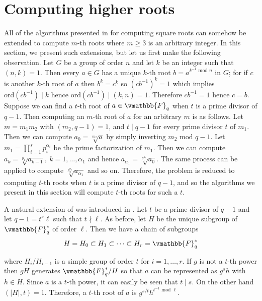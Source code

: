 \section{Computing higher roots}

All of the algorithms presented in  for computing square roots can 
somehow be extended to compute $m$-th roots where $m \ge 3$ is an arbitrary integer. In this 
section, we present such extensions, but let us first make the following observation. Let $G$ be a 
group of order $n$ and let $k$ be an integer such that $(n, k) = 1$. Then every $a \in G$ has a 
unique $k$-th root $b = a^{k^{-1} \text{ mod } n}$ in $G$; for if $c$ is another $k$-th root of $a$ 
then $b^k = c^k$ so $(cb^{-1})^k = 1$ which implies $\text{ord}(cb^{-1}) \mid k$ hence 
$\text{ord}(cb^{-1}) \mid (k, n) = 1$. Therefore $cb^{-1} = 1$ hence $c = b$. Suppose we can find a 
$t$-th root of $a \in \vmathbb{F}_q$ when $t$ is a prime divisor of $q - 1$. Then computing an $m$-th 
root of $a$ for an arbitrary $m$ is as follows. Let $m = m_1m_2$ with $(m_2, q - 1) = 1$, and $t 
\mid q - 1$ for every prime divisor $t$ of $m_1$. Then we can compute $a_0 = \sqrt[m_2]{a}$ by 
simply inverting $m_2 \text{ mod } q - 1$. Let $m_1 = \prod_{i = 1}^s{p_i^{\alpha_i}}$ be the prime 
factorization of $m_1$. Then we can compute $a_k = \sqrt[p_1]{a_{k - 1}},\: k = 1, \dots, \alpha_1$ 
and hence $a_{\alpha_1} = \sqrt[p_1^{\alpha_1}]{a_0}$. The same process can be applied to compute 
$\sqrt[p_2^{\alpha_2}]{a_{\alpha_1}}$ and so on. Therefore, the problem is reduced to computing 
$t$-th roots when $t$ is a prime divisor of $q - 1$, and so the algorithms we present in this 
section will compute $t$-th roots for such a $t$.

A natural extension of  was introduced in \cite{AdlManMil1977}. 
Let $t$ be a prime divisor of $q - 1$ and let $q - 1 = t^r\ell$ such that $t \nmid \ell$. As before, 
let $H$ be the unique subgroup of $\vmathbb{F}_q^*$ of order $\ell$. Then we have a chain of 
subgroups
$$
H = H_0 \subset H_1 \subset \cdots \subset H_r = \vmathbb{F}_q^*
$$

where $H_i / H_{i - 1}$ is a simple group of order $t$ for $i = 1, \dots, r$. If $g$ is not a $t$-th 
power then $gH$ generates $\vmathbb{F}_q^*/H$ so that $a$ can be represented as $g^sh$ with $h \in 
H$. Since $a$ is a $t$-th power, it can easily be seen that $t \mid s$. On the other hand $(\left| H 
\right|, t) = 1$. Therefore, a $t$-th root of $a$ is $g^{s/t}h^{t^{-1} \text{ mod } \ell}$. 

